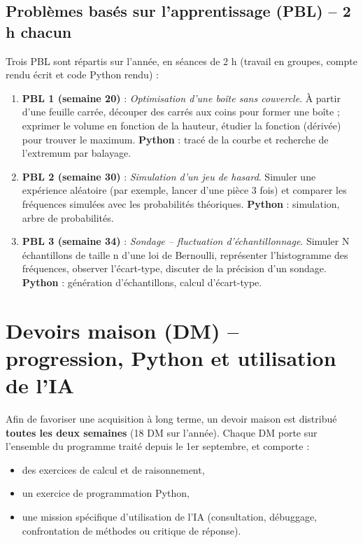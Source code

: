 \documentclass[a4paper,12pt]{article}
\begin{document}
	\subsection{Problèmes basés sur l’apprentissage (PBL) – 2 h chacun}
	Trois PBL sont répartis sur l’année, en séances de 2 h (travail en groupes, compte rendu écrit et code Python rendu) :
	
	\begin{enumerate}
		\item \textbf{PBL 1 (semaine 20)} : \emph{Optimisation d’une boîte sans couvercle}. À partir d’une feuille carrée, découper des carrés aux coins pour former une boîte ; exprimer le volume en fonction de la hauteur, étudier la fonction (dérivée) pour trouver le maximum. \textbf{Python} : tracé de la courbe et recherche de l’extremum par balayage.
		\item \textbf{PBL 2 (semaine 30)} : \emph{Simulation d’un jeu de hasard}. Simuler une expérience aléatoire (par exemple, lancer d’une pièce 3 fois) et comparer les fréquences simulées avec les probabilités théoriques. \textbf{Python} : simulation, arbre de probabilités.
		\item \textbf{PBL 3 (semaine 34)} : \emph{Sondage – fluctuation d’échantillonnage}. Simuler N échantillons de taille n d’une loi de Bernoulli, représenter l’histogramme des fréquences, observer l’écart-type, discuter de la précision d’un sondage. \textbf{Python} : génération d’échantillons, calcul d’écart-type.
	\end{enumerate}
	
	\section{Devoirs maison (DM) -- progression, Python et utilisation de l’IA}
	
	Afin de favoriser une acquisition à long terme, un devoir maison est distribué \textbf{toutes les deux semaines} (18 DM sur l’année).  
	Chaque DM porte sur l’ensemble du programme traité depuis le 1er septembre, et comporte :
	\begin{itemize}
		\item des exercices de calcul et de raisonnement,
		\item un exercice de programmation Python,
		\item une mission spécifique d’utilisation de l’IA (consultation, débuggage, confrontation de méthodes ou critique de réponse).
	\end{itemize}
	
\end{document}
